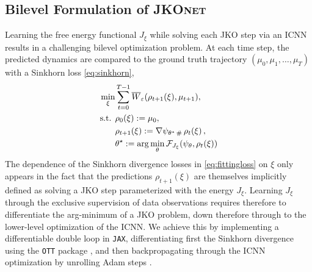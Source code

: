 \subsection{Bilevel Formulation of \textsc{JKOnet}}
Learning the free energy functional $J_\xi$ while solving each JKO step via an ICNN results in a challenging bilevel optimization problem.
At each time step, the predicted dynamics are compared to the ground truth trajectory $(\mu_0, \mu_1, \dots, \mu_T)$ with a Sinkhorn loss \eqref{eq:sinkhorn},
\begin{align}\label{eq:fittingloss}
\begin{split}
    \min_\xi & \sum_{t=0}^{T-1} \overline{W}_{\varepsilon}(\rho_{t+1}(\xi), \mu_{t+1}), \\
    \text{s.t. } & \rho_{0}(\xi) := \mu_0, \\
      & \rho_{t+1}(\xi) := \nabla \psi_{\theta^\star\, \#}\, \rho_{t}(\xi)\,, \\
      & \theta^\star:=\arg \min_{\theta} \mathcal{F}_{J_{\xi}}(\psi_{\theta},\rho_t(\xi))
\end{split}
\end{align}
The dependence of the Sinkhorn divergence losses in \eqref{eq:fittingloss} on $\xi$ only appears in the fact that the predictions $\rho_{t+1}(\xi)$ are themselves implicitly defined as solving a JKO step parameterized with the energy $J_\xi$. 
Learning  $J_\xi$ through the exclusive supervision of data observations requires therefore to differentiate the arg-minimum of a JKO problem, down therefore through to the lower-level optimization of the ICNN. We achieve this by implementing a differentiable double loop in \texttt{JAX}, differentiating first the Sinkhorn divergence using the \texttt{OTT} package \citep{cuturi2022optimal}, and then backpropagating through the ICNN optimization by unrolling Adam steps \citep{kingma2014adam, metz2016unrolled, lorraine2020}.


